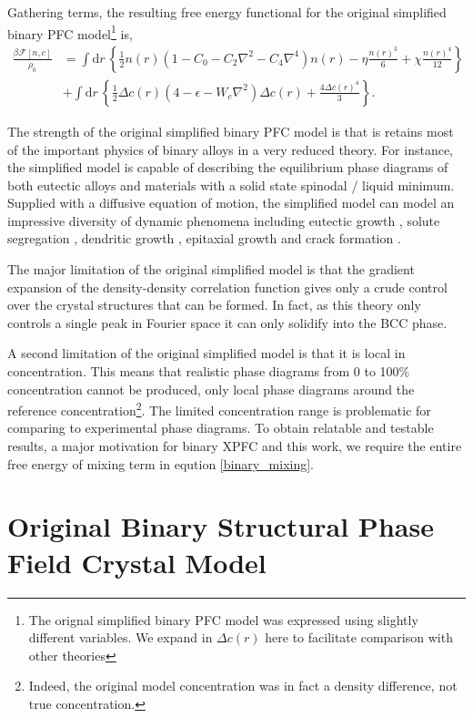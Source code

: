\documentclass[showkeys, prb, reprint]{revtex4-1}
\newcommand{\F}{\mathcal{F}}    %
\renewcommand{\l}{\left}        %
\renewcommand{\r}{\right}       %
\newcommand{\f}{\frac}          %
\newcommand{\integrate}[1]{\int \mathrm{d}#1\,}
\begin{document}
Gathering terms, the resulting free energy functional for the original
simplified binary PFC model\footnote{The orignal simplified binary PFC model
was expressed using slightly different variables. We expand in $\Delta c(r)$
here to facilitate comparison with other theories} is,
%
\begin{align}
    \f{\beta\F[n, c]}{\rho_0} &= \integrate{r} \l\lbrace 
        \f{1}{2} n(r) \l( 1 - C_0 - C_2 \nabla^2 - C_4\nabla^4 \r) n(r)
      - \eta\f{n(r)^3}{6} + \chi\f{n(r)^4}{12} \r\rbrace \\
    &+ \integrate{r} \l\lbrace
        \f{1}{2} \Delta c(r) \l( 4 - \epsilon - W_c\nabla^2 \r) \Delta c(r) 
      + \f{4 \Delta c(r)^4}{3} \r\rbrace. \nonumber
\end{align}
%

The strength of the original simplified binary PFC model is that is retains
most of the important physics of binary alloys in a very reduced theory. For
instance, the simplified model is capable of describing the equilibrium phase
diagrams of both eutectic alloys and materials with a solid state spinodal /
liquid minimum.  Supplied with a diffusive equation of motion, the simplified
model can model an impressive diversity of dynamic phenomena including eutectic
growth \cite{ELDER07}, solute segregation \cite{STOLLE14}, dendritic growth
\cite{ELDER07}, epitaxial growth \cite{ELDER10_NANOISLAND, LU16} and crack
formation \cite{HU17}.

The major limitation of the original simplified model is that the gradient
expansion of the density-density correlation function gives only a crude
control over the crystal structures that can be formed. In fact, as this theory
only controls a single peak in Fourier space it can only solidify into the BCC
phase.

A second limitation of the original simplified model is that it is local in
concentration. This means that realistic phase diagrams from 0 to 100\%
concentration cannot be produced, only local phase diagrams around the
reference concentration\footnote{Indeed, the original model concentration was
in fact a density difference, not true concentration.}. The limited
concentration range is problematic for comparing to experimental phase
diagrams. To obtain relatable and testable results, a major motivation for
binary XPFC and this work, we require the entire free energy of mixing term in
eqution \ref{binary_mixing}.

\section{Original Binary Structural Phase Field Crystal Model} %
\end{document}
